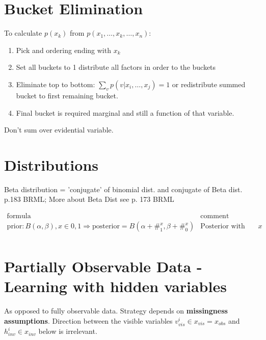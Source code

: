 \documentclass[a4paper,10pt]{article}
\begin{document}
\section{Bucket Elimination}

To calculate $p(x_k)$ from $p(x_1,\ldots,x_k,\ldots,x_n)$:
\begin{enumerate}
 \item Pick and ordering ending with $x_k$
 \item Set all buckets to 1 distribute all factors in order to the buckets 
 \item Eliminate top to bottom: $\sum_v p(v|x_i,\ldots,x_j) = 1$ or redistribute summed bucket to first remaining bucket.
 \item Final bucket is required marginal and still a function of that variable. 
\end{enumerate}

Don't sum over evidential variable.


\section{Distributions }

Beta distribution = 'conjugate' of binomial dist. and conjugate of Beta dist. p.183 BRML; More about Beta Dist see p. 173 BRML

$$\begin{array}{l|c}
 \textrm{formula} & \textrm{comment}\\
\textrm{prior}: B(\alpha,\beta), x \in {0,1} \Rightarrow \textrm{posterior} = B(\alpha + \#^x_1, \beta + \#^x_0) & \textrm{Posterior  with  with Beta-disribution for binary variable $x$}\\
\end{array}$$

\section{Partially Observable Data - Learning with hidden variables}
As opposed to fully observable data. Strategy depends on \textbf{missingness assumptions}. Direction between the visible variables $v_{vis}^i \in x_{vis} = x_{obs}$ and $h_{inv}^i \in x_{inv}$ below is irrelevant.
\end{document}
